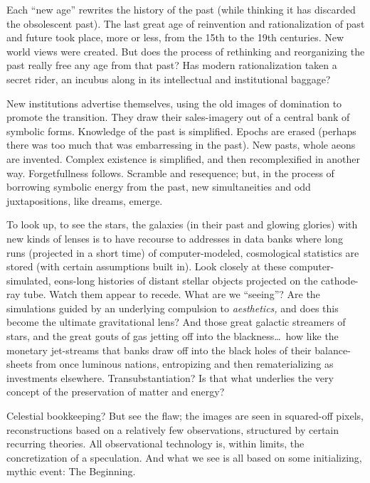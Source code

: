 Each \enquote{new age} rewrites the history of the past (while thinking it has discarded the obsolescent past). The last great age of reinvention and rationalization of past and future took place, more or less, from the 15th to the 19th centuries. New world views were created. But does the process of rethinking and reorganizing the past really free any age from that past? Has modern rationalization taken a secret rider, an incubus along in its intellectual and institutional baggage?

New institutions advertise themselves, using the old images of domination to promote the transition. They draw their sales-imagery out of a central bank of symbolic forms. Knowledge of the past is simplified. Epochs are erased (perhaps there was too much that was embarressing in the past). New pasts, whole aeons are invented. Complex existence is simplified, and then recomplexified in another way. Forgetfullness follows. Scramble and resequence; but, in the process of borrowing symbolic energy from the past, new simultaneities and odd juxtapositions, like dreams, emerge.

To look up, to see the stars, the galaxies (in their past and glowing glories) with new kinds of lenses is to have recourse to addresses in data banks where long runs (projected in a short time) of computer-modeled, cosmological statistics are stored (with certain assumptions built in). Look closely at these computer-simulated, eons-long histories of distant stellar objects projected on the cathode-ray tube. Watch them appear to recede. What are we \enquote{seeing}? Are the simulations guided by an underlying compulsion to \emph{aesthetics,} and does this become the ultimate gravitational lens? And those great galactic streamers of stars, and the great gouts of gas jetting off into the blackness\ldots\ how like the monetary jet-streams that banks draw off into the black holes of their balance-sheets from once luminous nations, entropizing and then rematerializing as investments elsewhere. Transubstantiation? Is that what underlies the very concept of the preservation of matter and energy?

Celestial bookkeeping? But see the flaw; the images are seen in squared-off pixels, reconstructions based on a relatively few observations, structured by certain recurring theories. All observational technology is, within limits, the concretization of a speculation. And what we see is all based on some initializing, mythic event: The Beginning.

